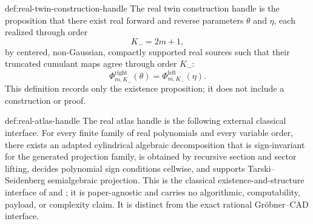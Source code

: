 \begin{definitionv}{def:real-twin-construction-handle}
The real twin construction handle is the proposition that there exist real forward and reverse parameters \(\theta\) and \(\eta\), each realized through order
\[
K_-=2m+1,
\]
by centered, non-Gaussian, compactly supported real sources
such that their truncated cumulant maps agree through order \(K_-\):
\[
\Phi^{\mathrm{right}}_{m,K_-}(\theta)=\Phi^{\mathrm{left}}_{m,K_-}(\eta).
\]
This definition records only the existence proposition; it does not include a construction or proof.
\end{definitionv}

\begin{remarkv}{def:real-atlas-handle}
The real atlas handle is the following external classical interface.  For every finite family of real polynomials and every variable order, there exists an adapted cylindrical algebraic decomposition that is sign-invariant for the generated projection family, is obtained by recursive section and sector lifting, decides polynomial sign conditions cellwise, and supports Tarski--Seidenberg semialgebraic projection.  This is the classical existence-and-structure interface of \citet[Section~2.3 and Theorem~2.2.1]{BochnakCosteRoy1998} and \citet[Chapter~5]{BasuPollackRoy2006}; it is paper-agnostic and carries no algorithmic, computability, payload, or complexity claim.  It is distinct from the exact rational Gröbner--CAD interface.
\end{remarkv}

